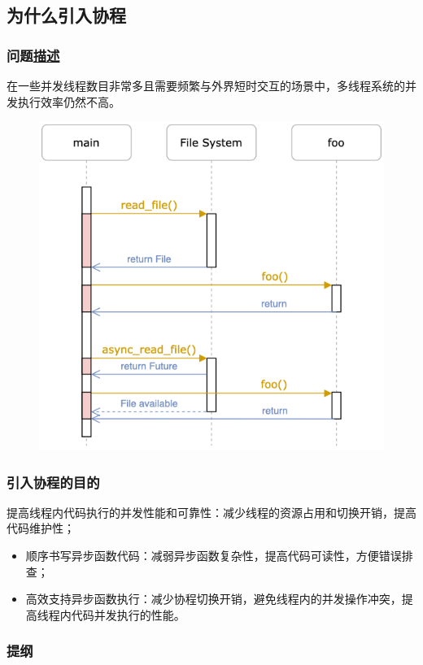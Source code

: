 \subsection{为什么引入协程}
% 
\begin{frame}[fragile]
    \frametitle{问题\href{https://os.phil-opp.com/async-await/\#example}{描述}}
% 
在一些并发线程数目非常多且需要频繁与外界短时交互的场景中，多线程系统的并发执行效率仍然不高。 \pause
% 

  \begin{figure}
    \centering
    \includegraphics[width=0.45\linewidth]{figs/async-example.png}
  \end{figure}



% 

\end{frame}
\begin{frame}[fragile]
    \frametitle{引入协程的目的}

提高线程内代码执行的并发性能和可靠性：减少线程的资源占用和切换开销，提高代码维护性； \pause
    \begin{itemize}
        \item 顺序书写异步函数代码：减弱异步函数复杂性，提高代码可读性，方便错误排查； \pause
        \item 高效支持异步函数执行：减少协程切换开销，避免线程内的并发操作冲突，提高线程内代码并发执行的性能。
    \end{itemize}
\end{frame}
% 
\begin{frame}
\frametitle{提纲} %
\tableofcontents %
\end{frame}
